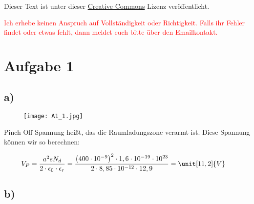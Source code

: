 




\maketitle

Dieser Text ist unter dieser \href{http://creativecommons.org/licenses/by-nc-sa/4.0/}{Creative Commons} Lizenz veröffentlicht.

\textcolor{red}{Ich erhebe keinen Anspruch auf Vollständigkeit oder Richtigkeit. Falls ihr Fehler findet oder etwas fehlt, dann meldet euch bitte über den Emailkontakt.}

\tableofcontents


\newpage



\section{Aufgabe 1}

\subsection*{a)}

\begin{figure}[h]
	\centering
	\texttt{[image: A1\_1.jpg]}
\end{figure}

Pinch-Off Spannung heißt, das die Raumladungszone verarmt ist. Diese Spannung können wir so berechnen:

\begin{align*}
V_P &= \frac{a^2 e N_d}{2 \cdot \epsilon_0 \cdot \epsilon_r} = \frac{\left( 400 \cdot 10^{-9} \right)^2 \cdot 1,6 \cdot 10^{-19} \cdot 10^{23}}{2 \cdot 8,85 \cdot 10^{-12} \cdot 12,9} = \unit[11,2]{V}
\end{align*}


\subsection*{b)}

